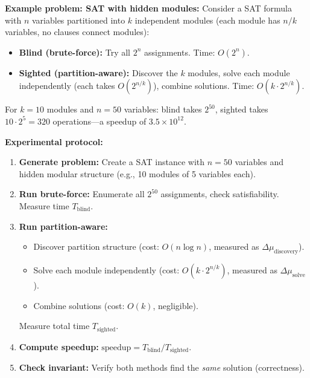 \textbf{Example problem: SAT with hidden modules:}
Consider a SAT formula with $n$ variables partitioned into $k$ independent modules (each module has $n/k$ variables, no clauses connect modules):
\begin{itemize}
    \item \textbf{Blind (brute-force):} Try all $2^n$ assignments. Time: $O(2^n)$.
    
    \item \textbf{Sighted (partition-aware):} Discover the $k$ modules, solve each module independently (each takes $O(2^{n/k})$), combine solutions. Time: $O(k \cdot 2^{n/k})$.
\end{itemize}
For $k = 10$ modules and $n = 50$ variables: blind takes $2^{50}$, sighted takes $10 \cdot 2^{5} = 320$ operations---a speedup of $3.5 \times 10^{12}$.

\textbf{Experimental protocol:}
\begin{enumerate}
    \item \textbf{Generate problem:} Create a SAT instance with $n = 50$ variables and hidden modular structure (e.g., 10 modules of 5 variables each).
    
    \item \textbf{Run brute-force:} Enumerate all $2^{50}$ assignments, check satisfiability. Measure time $T_{\text{blind}}$.
    
    \item \textbf{Run partition-aware:}
    \begin{itemize}
        \item Discover partition structure (cost: $O(n \log n)$, measured as $\Delta\mu_{\text{discovery}}$).
        \item Solve each module independently (cost: $O(k \cdot 2^{n/k})$, measured as $\Delta\mu_{\text{solve}}$).
        \item Combine solutions (cost: $O(k)$, negligible).
    \end{itemize}
    Measure total time $T_{\text{sighted}}$.
    
    \item \textbf{Compute speedup:} $\text{speedup} = T_{\text{blind}} / T_{\text{sighted}}$.
    
    \item \textbf{Check invariant:} Verify both methods find the \textit{same} solution (correctness).
\end{enumerate}

